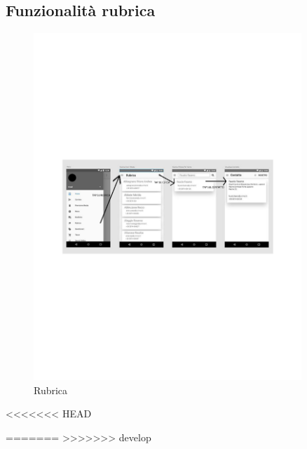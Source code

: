 \subsection{Funzionalità rubrica}
\begin{figure}[H]
	\centering
	\includegraphics[width=0.9\textwidth]{imgs/gruppo5/activity.pdf}
	\caption{Rubrica}
	\label{fig:act-rubrica}
\end{figure}
<<<<<<< HEAD

=======
>>>>>>> develop

\clearpage
